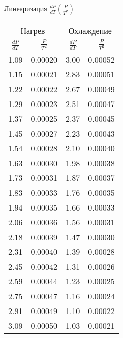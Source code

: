 \begin{subtable}{0.48\textwidth}\centering
\caption{Линеаризация  $\frac{dP}{dT}(\frac{P}{T^2})$}
\label{tab:linear2}
\begin{tabular}{cccc}
\toprule
\multicolumn{2}{c}{Нагрев} & \multicolumn{2}{c}{Охлаждение} \\
$\frac{dP}{dT}$ & $\frac{P}{T^2}$ & $\frac{dP}{dT}$ & $\frac{P}{T^2}$ \\
\midrule
1.09 & 0.00020 & 3.00 & 0.00052 \\
1.15 & 0.00021 & 2.83 & 0.00051 \\
1.22 & 0.00022 & 2.67 & 0.00049 \\
1.29 & 0.00023 & 2.51 & 0.00047 \\
1.37 & 0.00025 & 2.37 & 0.00045 \\
1.45 & 0.00027 & 2.23 & 0.00043 \\
1.54 & 0.00028 & 2.10 & 0.00040 \\
1.63 & 0.00030 & 1.98 & 0.00038 \\
1.73 & 0.00031 & 1.87 & 0.00037 \\
1.83 & 0.00033 & 1.76 & 0.00035 \\
1.94 & 0.00035 & 1.66 & 0.00033 \\
2.06 & 0.00036 & 1.56 & 0.00031 \\
2.18 & 0.00039 & 1.47 & 0.00030 \\
2.31 & 0.00040 & 1.39 & 0.00028 \\
2.45 & 0.00042 & 1.31 & 0.00026 \\
2.59 & 0.00044 & 1.23 & 0.00025 \\
2.75 & 0.00047 & 1.16 & 0.00024 \\
2.91 & 0.00049 & 1.10 & 0.00022 \\
3.09 & 0.00050 & 1.03 & 0.00021 \\
\bottomrule
\end{tabular}
\end{subtable}

